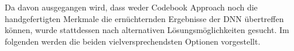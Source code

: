

Da davon ausgegangen wird, dass weder Codebook Approach noch die handgefertigten Merkmale die ernüchternden Ergebnisse der DNN übertreffen können, wurde stattdessen nach alternativen Lösungsmöglichkeiten gesucht.
Im folgenden werden die beiden vielversprechendsten Optionen vorgestellt.









